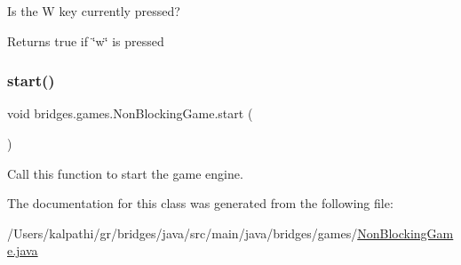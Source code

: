 Is the W key currently pressed? 

\begin{DoxyReturn}{Returns}
true if \char`\"{}w\char`\"{} is pressed 
\end{DoxyReturn}
\mbox{\label{classbridges_1_1games_1_1_non_blocking_game_ac4df60691641278f139d138c7347674a}} 
\subsubsection{\texorpdfstring{start()}{start()}}
{\footnotesize\ttfamily void bridges.\+games.\+Non\+Blocking\+Game.\+start (\begin{DoxyParamCaption}{ }\end{DoxyParamCaption})}

Call this function to start the game engine. 

The documentation for this class was generated from the following file\+:\begin{DoxyCompactItemize}
\item 
/\+Users/kalpathi/gr/bridges/java/src/main/java/bridges/games/\mbox{\hyperlink{_non_blocking_game_8java}{Non\+Blocking\+Game.\+java}}\end{DoxyCompactItemize}
